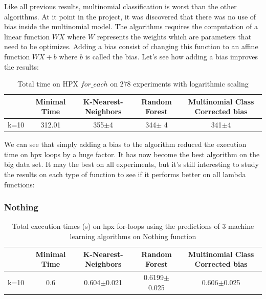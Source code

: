 Like all previous results, multinomial classification is worst than the other algorithms. At it point in the project, it was discovered that there was no use of bias inside the multinomial model. The algorithms requires the computation of a linear function $W X$ where $W$ represents the weights which are parameters that need to be optimizes. Adding a bias consist of changing this function to an affine function $WX+b$ where $b$ is called the bias. Let's see how adding a bias improves the results:

\begin{table}[h]
	\centering
	\caption{Total time on HPX $for\_each$ on 278 experiments with logarithmic scaling}
	\label{my-label}
	\begin{tabular}{|c|c|c|c|c|}
		\hline
		& Minimal Time&K-Nearest-Neighbors & Random Forest &Multinomial Class Corrected bias\\ \hline
		k=10  &312.01&
		355$\pm$4        & 344$\pm$ 4&341$\pm$4 \\ \hline
	\end{tabular}
\end{table}
We can see that simply adding a bias to the algorithm reduced the execution time on hpx loops by a huge factor. It has now become the best algorithm on the big data set. It may the best on all experiments, but it's still interesting to study the results on each type of function to see if it performs better on all lambda functions:
\newpage
\subsubsection{Nothing}

\begin{table}[h]
	\centering
	\caption{Total execution times (s) on hpx for-loops using the predictions of 3 machine learning algorithms on Nothing function}
	\label{my-label}
	\begin{tabular}{|c|c|c|c|c|}
		\hline
		& Minimal Time&K-Nearest-Neighbors & Random Forest &Multinomial Class Corrected bias\\ \hline
		k=10  &0.6&
		0.604$\pm$0.021       & 0.6199$\pm$0.025&0.606$\pm$0.025 \\ \hline
	\end{tabular}
\end{table}

